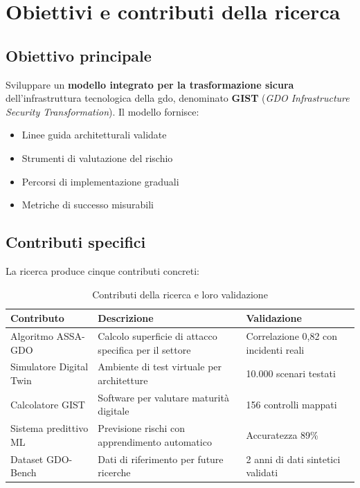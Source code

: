 \section{\texorpdfstring{Obiettivi e contributi della ricerca}{1.3 - Obiettivi e contributi della ricerca}}
\label{sec:obiettivi_contributi}

\subsection{\texorpdfstring{Obiettivo principale}{1.3.1 - Obiettivo principale}}
\label{subsec:obiettivo_principale}

Sviluppare un \textbf{modello integrato per la trasformazione sicura} dell'infrastruttura tecnologica della \gls{gdo}, denominato \textbf{GIST} (\textit{GDO Infrastructure Security Transformation}). Il modello fornisce:

\begin{itemize}
\item Linee guida architetturali validate
\item Strumenti di valutazione del rischio
\item Percorsi di implementazione graduali
\item Metriche di successo misurabili
\end{itemize}

\subsection{\texorpdfstring{Contributi specifici}{1.3.2 - Contributi specifici}}
\label{subsec:contributi_specifici}

La ricerca produce cinque contributi concreti:

\begin{table}[htbp]
\centering
\caption{Contributi della ricerca e loro validazione}
\label{tab:contributi}
\begin{tabular}{|p{4cm}|p{5cm}|p{4cm}|}
\hline
\textbf{Contributo} & \textbf{Descrizione} & \textbf{Validazione} \\
\hline
Algoritmo ASSA-GDO & Calcolo superficie di attacco specifica per il settore & Correlazione 0,82 con incidenti reali \\
\hline
Simulatore Digital Twin & Ambiente di test virtuale per architetture & 10.000 scenari testati \\
\hline
Calcolatore GIST & Software per valutare maturità digitale & 156 controlli mappati \\
\hline
Sistema predittivo ML & Previsione rischi con apprendimento automatico & Accuratezza 89\% \\
\hline
Dataset GDO-Bench & Dati di riferimento per future ricerche & 2 anni di dati sintetici validati \\
\hline
\end{tabular}
\end{table}

